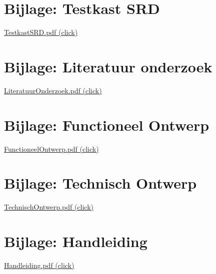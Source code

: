 \appendix

\section{Bijlage: Testkast SRD} \label{sec:TestKastSRD}

\href{run:TestkastSRD.pdf}{TestkastSRD.pdf (click)}

\section{Bijlage: Literatuur onderzoek} \label{sec:LiteratuurOnderzoek}

\href{run:LiteratuurOnderzoek.pdf}{LiteratuurOnderzoek.pdf (click)}

\section{Bijlage: Functioneel Ontwerp} \label{sec:FunctioneelOntwerp}

\href{run:FunctioneelOntwerp.pdf}{FunctioneelOntwerp.pdf (click)}

\section{Bijlage: Technisch Ontwerp} \label{sec:TechnischOntwerp}

\href{run:TechnischOntwerp.pdf}{TechnischOntwerp.pdf (click)}

\section{Bijlage: Handleiding} \label{sec:Handleiding}

\href{run:Handleiding.pdf}{Handleiding.pdf (click)}